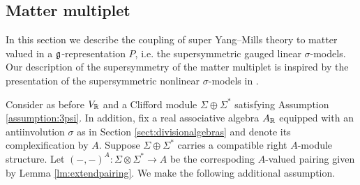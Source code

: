 \documentclass[10pt, oneside]{article}
\begin{document}
\begin{comment}
\pavel{This might go in the coupling section.}
We can deduce supersymmetry for other super Yang-Mills theories using dimensional reduction, specifically Proposition \ref{dim_red_SUSY_prop}.
\begin{corollary}
Let $n$ be one of the special dimensions $3,4,6$ or 10, and choose $m < n$.  Let $\Sigma'$ be the $\so(m)$ representation obtained by restriction of the $\so(n)$ representation $\Sigma$.  Then the super Poincar\'e algebra
\[\mf A' = \mf{iso}(m) \oplus \Pi \Sigma',\]
obtained by restricting the $n$-dimensional super Poincar\'e algebra associated to $\Sigma$, acts on the $m$-dimensional super Yang-Mills theory $\mf L'$ with matter representation $\Sigma'$.
\end{corollary}

\begin{proof}
This follows immediately by applying Proposition \ref{dim_red_SUSY_prop} to the $\mf A$-supersymmetric theory $\mf L$ on $\RR^n$.
\end{proof}

\begin{remark}
We can further include the action of at least a subalgebra of the algebra of R-symmetries in each example. \chris{quantify which}
\end{remark}
\end{comment}

\subsection{Matter multiplet}
\label{sect:mattermultipletSUSY}

In this section we describe the coupling of super Yang--Mills theory to matter valued in a $\mathfrak g$-representation $P$, i.e. the supersymmetric gauged linear $\sigma$-models. Our description of the supersymmetry of the matter multiplet is inspired by the presentation of the supersymmetric nonlinear $\sigma$-models in \cite[Chapter 3]{DeligneFreed}.

Consider as before $V_\mathbb R$ and a Clifford module $\Sigma\oplus \Sigma^*$ satisfying Assumption \ref{assumption:3psi}. In addition, fix a real associative algebra $A_\mathbb R$ equipped with an antiinvolution $\sigma$ as in Section \ref{sect:divisionalgebras} and denote its complexification by $A$. Suppose $\Sigma\oplus \Sigma^*$ carries a compatible right $A$-module structure. Let $(-, -)^A\colon \Sigma\otimes \Sigma^*\rightarrow A$ be the correspoding $A$-valued pairing given by Lemma \ref{lm:extendpairing}. We make the following additional assumption.
\end{document}
